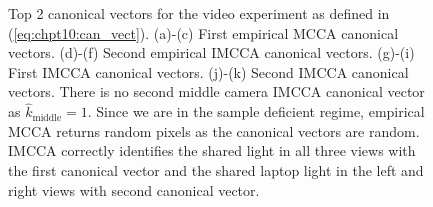 \begin{figure}
\begin{center}
{    }
    \hspace{27ex}
    \caption{Top 2 canonical vectors for the video experiment as defined in
      (\ref{eq:chpt10:can_vect}). (a)-(c) First empirical MCCA canonical vectors. (d)-(f)
      Second empirical IMCCA canonical vectors. (g)-(i) First IMCCA canonical
      vectors. (j)-(k) Second IMCCA canonical vectors. There is no second middle camera
      IMCCA canonical vector as $\widehat{k}_{\text{middle}}=1$. Since we are in the
      sample deficient regime, empirical MCCA returns random pixels as the canonical
      vectors are random. IMCCA correctly identifies the shared light in all three views
      with the first canonical vector and the shared laptop light in the left and right
      views with second canonical vector.}
    \label{fig:chpt10:mcca_cca_vects}
  \end{center}
\end{figure}

